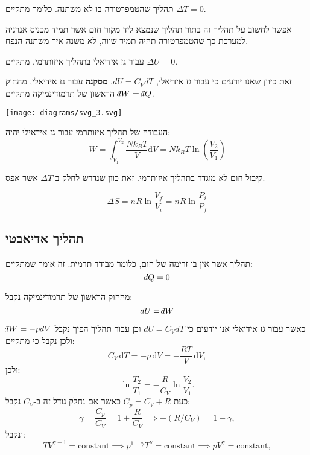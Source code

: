 \documentclass{tstextbook}
\begin{document}
\begin{definition}
תהליך שהטמפרטורה בו לא משתנה. כלומר מתקיים \(\Delta T=0\).

\end{definition}
אפשר לחשוב על תהליך זה בתור תהליך שנמצא ליד מקור חום אשר תמיד מכניס אנרגיה למערכת כך שהטמפרטורה תהיה תמיד שווה, לא משנה איך משתנה הנפח.

\begin{proposition}
עבור גז אידיאלי בתהליך איזותרמי, מתקיים \(\Delta U=0\).

\end{proposition}
זאת כיוון שאנו יודעים כי עבור גז אידיאלי,  \(dU=C_{V}dT\).
\textbf{מסקנה}
עבור גז אידיאלי, מהחוק הראשון של תרמודינמיקה מתקיים \(\;\bar{}\mkern-7.5mu dW=\;\bar{}\mkern-7.5mu dQ\).

\texttt{[image: diagrams/svg\_3.svg]}
\begin{proposition}
העבודה של תהליך איזותרמי עבור גז אידאילי יהיה:
$$W=\int_{V_{1}}^{V_{2}} \frac{Nk_{B}T}{V} \mathrm{d}V=Nk_{B}T\ln\left( \frac{V_{2}}{V_{1}} \right)$$

\end{proposition}
\begin{remark}
קיבול חום לא מוגדר בתהליך איזותרמי. זאת כוון שנדרש לחלק ב-\(\Delta T\) אשר אפס.

\end{remark}
\begin{proposition}
$$\Delta S=n R\ln{\frac{V_{f}}{V_{i}}}=n R\ln{\frac{P_{i}}{P_{f}}}$$

\end{proposition}
\subsection{תהליך אדיאבטי}

\begin{definition}
תהליך אשר אין בו זרימה של חום, כלומר מבודד תרמית. זה אומר שמתקיים:
$$\;\bar{}\mkern-7.5mu dQ=0$$

\end{definition}
\begin{corollary}
מהחוק הראשון של תרמודינמיקה נקבל:
$$dU=\;\bar{}\mkern-7.5mu dW$$

\end{corollary}
כאשר עבור גז אידיאלי אנו יודעים כי \(dU=C_{V}dT\) וכן עבור תהליך הפיך נקבל \(\;\bar{}\mkern-7.5mu dW=-pdV\) ולכן נקבל כי מתקיים:
$$C_{V}\,\mathrm{d}T=-p\,\mathrm{d}V=-{\frac{R T}{V}}\,\mathrm{d}V,$$
ולכן:
$$\ln\frac{T_{2}}{T_{1}}=-\frac{R}{C_{V}}\ln\frac{V_{2}}{V_{1}}.$$
כעת \(C_{p}=C_{V}+R\) כאשר אם נחלק גודל זה ב-\(C_{V}\) נקבל:
$$\gamma=\frac{C_{p}}{C_{V}}=1+\frac{R}{C_{V}}\implies-(R/C_{V})=1-\gamma,$$
ונקבל:
$$T V^{\gamma-1}={\mathrm{constant}} \implies p^{1-\gamma}T^{\gamma}=\mathrm{constant}\implies p V^{\gamma}={\mathrm{constant}},$$
\end{document}
